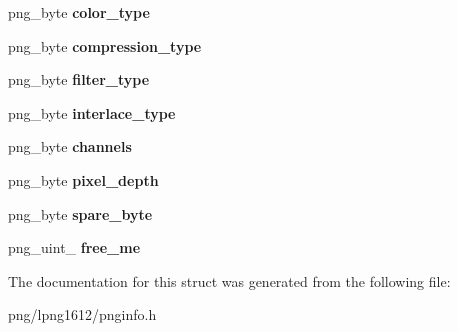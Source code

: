 \begin{DoxyCompactItemize}
\item 
\hypertarget{structpng__info__def_aa89dde7a6d87c229e9a4d6313fb4537b}{png\+\_\+byte {\bfseries color\+\_\+type}}\label{structpng__info__def_aa89dde7a6d87c229e9a4d6313fb4537b}

\item 
\hypertarget{structpng__info__def_ab282a14aee6f0e080a7a4399b412fd20}{png\+\_\+byte {\bfseries compression\+\_\+type}}\label{structpng__info__def_ab282a14aee6f0e080a7a4399b412fd20}

\item 
\hypertarget{structpng__info__def_aa9a869f34f99f9d02e476892e68a26ea}{png\+\_\+byte {\bfseries filter\+\_\+type}}\label{structpng__info__def_aa9a869f34f99f9d02e476892e68a26ea}

\item 
\hypertarget{structpng__info__def_afad8a12cf463fed8ab5fe29e3d85b6c1}{png\+\_\+byte {\bfseries interlace\+\_\+type}}\label{structpng__info__def_afad8a12cf463fed8ab5fe29e3d85b6c1}

\item 
\hypertarget{structpng__info__def_ab0bafa25f05331940beb673783b1fac8}{png\+\_\+byte {\bfseries channels}}\label{structpng__info__def_ab0bafa25f05331940beb673783b1fac8}

\item 
\hypertarget{structpng__info__def_ab98a44dd6a8e1c0258019469c77ffa2b}{png\+\_\+byte {\bfseries pixel\+\_\+depth}}\label{structpng__info__def_ab98a44dd6a8e1c0258019469c77ffa2b}

\item 
\hypertarget{structpng__info__def_a09cbd4c9a9727499a9e2deba0a8e9134}{png\+\_\+byte {\bfseries spare\+\_\+byte}}\label{structpng__info__def_a09cbd4c9a9727499a9e2deba0a8e9134}

\item 
\hypertarget{structpng__info__def_a80f147934033ea3c3da1addd182b7ef3}{png\+\_\+uint\+\_ {\bfseries free\+\_\+me}}\label{structpng__info__def_a80f147934033ea3c3da1addd182b7ef3}

\end{DoxyCompactItemize}


The documentation for this struct was generated from the following file\+:\begin{DoxyCompactItemize}
\item 
png/lpng1612/pnginfo.\+h\end{DoxyCompactItemize}
